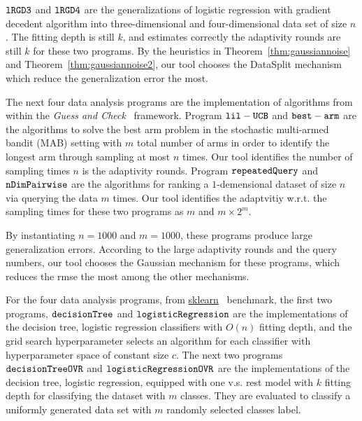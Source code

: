 $  \mathtt{ lRGD3 }$ and $  \mathtt{ lRGD4 }$ are the generalizations of logistic regression with gradient decedent
algorithm into three-dimensional and four-dimensional data set of size $n$.
The fitting depth is still $k$, and {\THESYSTEM} estimates correctly the adaptivity rounds are still $k$ for these two programs.
By the heuristics in Theorem~\ref{thm:gaussiannoise} and Theorem~\ref{thm:gaussiannoise2},
our tool chooses the DataSplit mechanism which reduce the generalization error the most.

The next four data analysis programs are the implementation of algorithms from~\cite{Jamieson2015TheAO} within the \emph{Guess and Check}~\cite{RogersRSSTW20} framework.
Program $\mathtt{lil-UCB}$ and $\mathtt{best-arm}$ are the algorithms to solve the best arm problem in the stochastic multi-armed bandit (MAB) setting
with $m$ total number of arms in order to identify the longest arm through sampling at most $n$ times.
Our tool identifies the number of sampling times $n$ is the adaptivity rounds.
Program $\mathtt{repeatedQuery}$ and $\mathtt{nDimPairwise}$ are the algorithms for ranking
a $1$-demensional dataset of size $n$ via querying the data $m$ times.
Our tool identifies the adaptvitiy w.r.t. the sampling times for these two programs as $m$ and $m \times 2^m$.


By instantiating $n = 1000$ and $m = 1000$, these programs produce large generalization errors.
According to the large adaptivity rounds and the query numbers, our tool chooses the Gaussian mechanism for these programs, which reduces the rmse the most
among the other mechanisms.


For the four data analysis programs, 
from \hyperlink{https://github.com/scikit-learn/scikit-learn/tree/main/examples}{sklearn}~\cite{SklearnBenchmark} benchmark,
the first two programs, $\mathtt{decisionTree}$ and $\mathtt{logisticRegression}$ are
the
implementations of the decision tree, logistic regression classifiers
with $O(n)$ fitting depth,
and the grid search hyperparameter selects an algorithm for each classifier with 
hyperparameter space of constant size $c$.
The next two programs $\mathtt{decisionTreeOVR}$ and $\mathtt{logisticRegressionOVR}$ are
the implementations of the decision tree, logistic regression, equipped with one v.s. rest model with $k$ fitting depth for classifying the dataset with $m$ classes.
They are evaluated to classify a uniformly generated data set with $m$ randomly selected classes label.

